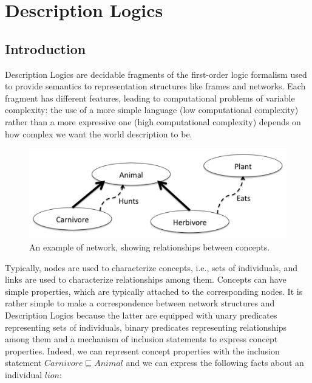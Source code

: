 \documentclass[a4paper, 11pt, oneside]{elsarticle}
\begin{document}
\newpage



\section{Description Logics}

\subsection{Introduction}
Description Logics are decidable fragments of the first-order logic formalism used to provide semantics to representation structures like frames and networks.
Each fragment has different features, leading to computational problems of variable complexity: the use of a more simple language (low computational complexity) rather than a more expressive one (high computational complexity) depends on how complex we want the world description to be.


\begin{figure}[htp]
\centering
\includegraphics[scale=.33]{img/relationship_network.png}
\caption{An example of network, showing relationships between concepts.}
\label{rel_net}
\end{figure}

Typically, nodes are used to characterize concepts, i.e., sets of individuals, and links are used to characterize relationships among them.
Concepts can have simple properties, which are typically attached to the corresponding nodes.
It is rather simple to make a correspondence between network structures and Description Logics because the latter are equipped with unary predicates representing sets of individuals, binary predicates representing relationships among them and a mechanism of inclusion statements to express concept properties.
Indeed, we can represent concept properties with the inclusion statement $Carnivore \sqsubseteq Animal$ and we can express the following facts about an individual $lion$: 
\end{document}
